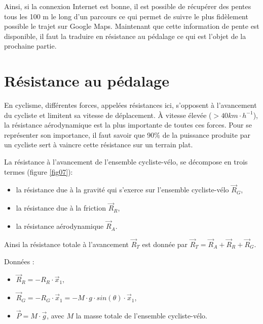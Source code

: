 Ainsi, si la connexion Internet est bonne, il est possible de récupérer des pentes tous les 100 m le long d'un parcours ce qui permet de suivre le plus fidèlement possible le trajet sur Google Maps. Maintenant que cette information de pente est disponible, il faut la traduire en résistance au pédalage ce qui est l'objet de la prochaine partie.

\section{Résistance au pédalage}


En cyclisme, différentes forces, appelées résistances ici, s'opposent à l'avancement du cycliste et limitent sa vitesse de déplacement. À vitesse élevée ($>40km\cdot h^{-1}$), la résistance aérodynamique est la plus importante de toutes ces forces. Pour se représenter son importance, il faut savoir que 90\% de la puissance produite par un cycliste sert à vaincre cette résistance sur un terrain plat.

La résistance à l'avancement de l'ensemble cycliste-vélo, se décompose en trois termes (figure \ref{fig07}):
\begin{itemize}
 \item la résistance due à la gravité qui s'exerce sur l'ensemble cycliste-vélo $\vec{R}_G$,
 \item la résistance due à la friction $\vec{R}_R$,
 \item la résistance aérodynamique $\vec{R}_A$.
\end{itemize}

Ainsi la résistance totale à l'avancement $\vec{R}_T$ est donnée par $\vec{R}_T=\vec{R}_A+\vec{R}_R+\vec{R}_G$.

Données :
\begin{itemize}
 \item $\vec{R}_R=-R_R\cdot\vec{x}_1$, 
 \item $\vec{R}_G=-R_G\cdot\vec{x}_1=-M\cdot g\cdot sin\left(\theta\right)\cdot\vec{x}_1$,
 \item $\vec{P}=M\cdot\vec{g}$, avec $M$ la masse totale de l'ensemble cycliste-vélo.
 \end{itemize}


